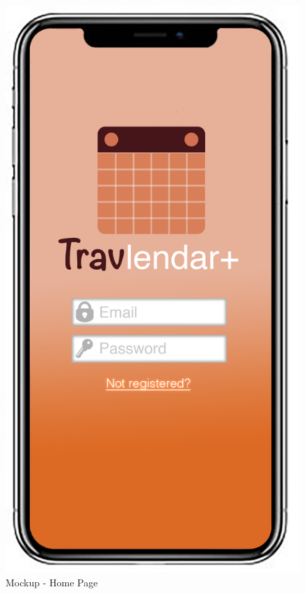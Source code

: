 \begin{figure}[H]	
	\centerline{\includegraphics[width=0.3\paperwidth]{Images/Home}}
	\caption{Mockup - Home Page}
\end{figure}	
